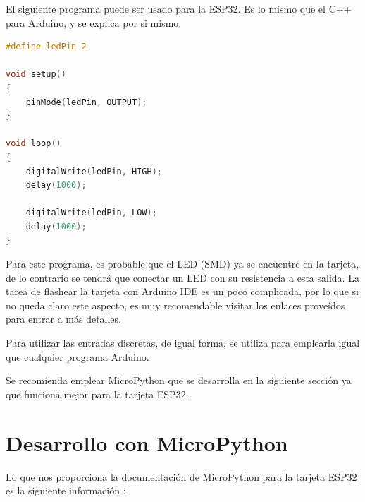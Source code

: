 \documentclass[conference]{IEEEtran}
\begin{document}
El siguiente programa puede ser usado para la ESP32. Es lo mismo que el C++
para Arduino, y se explica por si mismo.

\begin{lstlisting}[language=C, caption={Programa que hace parpadear el LED en
el pin 2}]
#define ledPin 2

void setup()
{
    pinMode(ledPin, OUTPUT);
}

void loop()
{
    digitalWrite(ledPin, HIGH);
    delay(1000);

    digitalWrite(ledPin, LOW);
    delay(1000);
}
\end{lstlisting}

Para este programa, es probable que el LED (SMD) ya se encuentre en la
tarjeta, de lo contrario se tendrá que conectar un LED con su resistencia a
esta salida. La tarea de flashear la tarjeta con Arduino IDE es un poco
complicada, por lo que si no queda claro este aspecto, es muy recomendable
visitar los enlaces proveídos para entrar a más detalles.

\bigbreak

Para utilizar las entradas discretas, de igual forma, se utiliza  para emplearla igual que cualquier programa Arduino.

\bigbreak

Se recomienda emplear MicroPython que se desarrolla en la siguiente sección
ya que funciona mejor para la tarjeta ESP32.

\section{Desarrollo con MicroPython}

Lo que nos proporciona la documentación de MicroPython para la tarjeta ESP32
es la siguiente información \cite{micropython-esp32}:
\end{document}
